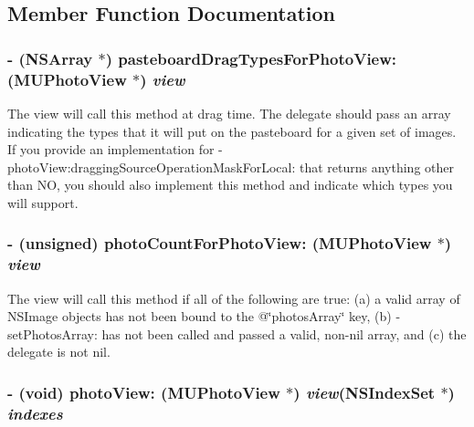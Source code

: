 \subsection{Member Function Documentation}
\subsubsection{\setlength{\rightskip}{0pt plus 5cm}- (NSArray $\ast$) pasteboard\-Drag\-Types\-For\-Photo\-View: ({\bf MUPhoto\-View} $\ast$) {\em view}}\label{category_n_s_object(_m_u_photo_view_delegate)_3c401ecbd6bc8839e0886e4c672fbce6}


The view will call this method at drag time. The delegate should pass an array indicating the types that it will put on the pasteboard for a given set of images. If you provide an implementation for -photo\-View:dragging\-Source\-Operation\-Mask\-For\-Local: that returns anything other than NO, you should also implement this method and indicate which types you will support. 
\subsubsection{\setlength{\rightskip}{0pt plus 5cm}- (unsigned) photo\-Count\-For\-Photo\-View: ({\bf MUPhoto\-View} $\ast$) {\em view}}\label{category_n_s_object(_m_u_photo_view_delegate)_5012fd973adbcb5165b0a830b46100f0}


The view will call this method if all of the following are true: (a) a valid array of NSImage objects has not been bound to the @\char`\"{}photos\-Array\char`\"{} key, (b) -set\-Photos\-Array: has not been called and passed a valid, non-nil array, and (c) the delegate is not nil. 
\subsubsection{\setlength{\rightskip}{0pt plus 5cm}- (void) photo\-View: ({\bf MUPhoto\-View} $\ast$) {\em view}(NSIndex\-Set $\ast$) {\em indexes}}\label{category_n_s_object(_m_u_photo_view_delegate)_dc1847e0791f5e39310c5ca7b2caaef5}


